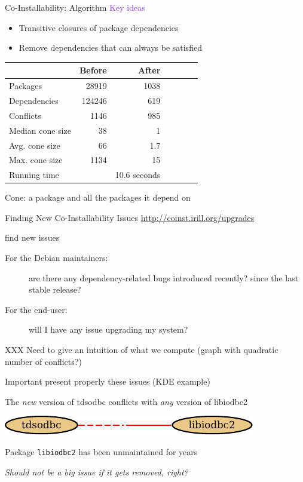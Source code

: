 \documentclass[xcolor={dvipsnames}]{beamer}
\newcommand{\EEE}[1]{\textcolor{BlueViolet}{#1}}
\begin{document}
\begin{frame}{Co-Installability: Algorithm}
\EEE{Key ideas}
\begin{itemize}
\item Transitive closures of package dependencies
\item Remove dependencies that can always be satisfied
\end{itemize}

\begin{center}
\begin{tabular}{@{}lrrrrrr@{}}
\toprule
& Before & After \\
\midrule
Packages & 28919 & 1038 \\
Dependencies & 124246 & 619 \\
Conflicts & 1146 & 985 \\
Median cone size & 38 & 1 \\
Avg. cone size & 66 & 1.7 \\
Max. cone size & 1134 & 15 \\
\midrule
Running time
& & 10.6 seconds
\\
\bottomrule
\end{tabular}
\end{center}
Cone: a package and all the packages it depend on

\end{frame}

\begin{frame}{Finding New Co-Installability Issues}
\url{http://coinst.irill.org/upgrades}

find new issues

\begin{description}
\item[For the Debian maintainers:]
are there any dependency-related bugs introduced recently? since the
last stable release?
\item[For the end-user:] will I have any issue upgrading my system?
\end{description}

XXX Need to give an intuition of what we compute
(graph with quadratic number of conflicts?)

Important present properly these issues (KDE example)

The \emph{new} version of tdsodbc conflicts with \emph{any} version of
libiodbc2

\begin{center}
\includegraphics{libiodbc2}
\end{center}

Package \texttt{libiodbc2} has been unmaintained for years

\emph{Should not be a big issue if it gets removed, right?}

\end{frame}
\end{document}
